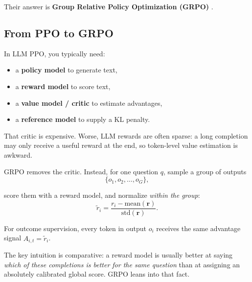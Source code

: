 \documentclass[11pt]{article}
\newcommand{\adv}{\hat{A}}
\begin{document}
  Their answer is \textbf{Group Relative Policy Optimization (GRPO)} \cite{deepseekmath}.

  \subsection{From PPO to GRPO}

  In LLM PPO, you typically need:

  \begin{itemize}
    \item a \textbf{policy model} to generate text,
    \item a \textbf{reward model} to score text,
    \item a \textbf{value model / critic} to estimate advantages,
    \item a \textbf{reference model} to supply a KL penalty.
  \end{itemize}

  That critic is expensive. Worse, LLM rewards are often sparse: a long completion may only receive a useful reward at the end, so token-level value estimation is awkward.

  GRPO removes the critic. Instead, for one question $q$, sample a group of outputs
  \[
  \{o_1,o_2,\dots,o_G\},
  \]

  score them with a reward model, and normalize \emph{within the group}:
  \[
  \tilde r_i = \frac{r_i - \mathrm{mean}(\mathbf r)}{\mathrm{std}(\mathbf r)}.
  \]

  For outcome supervision, every token in output $o_i$ receives the same advantage signal $\adv_{i,t}=\tilde r_i$.

  \begin{deepseekbox}
  The key intuition is comparative: a reward model is usually better at saying \emph{which of these completions is better for the same question} than at assigning an absolutely calibrated global score. GRPO leans into that fact.
  \end{deepseekbox}
\end{document}
